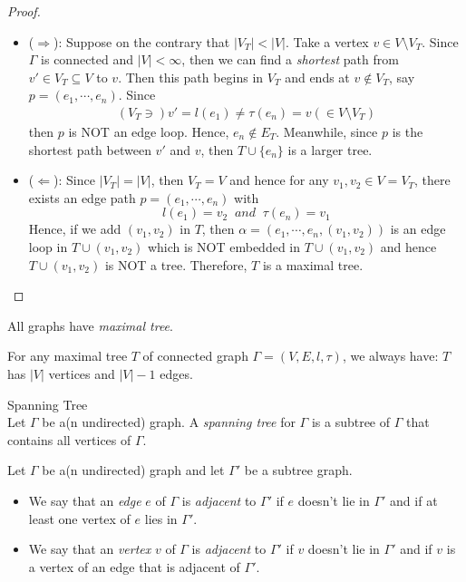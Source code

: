 \begin{proof}
    \begin{itemize}
        \item ($\Rightarrow$): Suppose on the contrary that $|V_T| < |V|$. Take a vertex $v \in V \setminus V_T$. Since $\Gamma$ is connected and $|V| <\infty$, then we can find a \textit{shortest} path from $v' \in V_T \subseteq V$ to $v$. Then this path begins in $V_T$ and ends at $v \notin V_T$, say $p= (e_1 ,\cdots, e_n)$. Since
        \begin{align*}
            (V_T \ni)   v' =l(e_1) \neq  \tau(e_n) = v (\in V \setminus V_T)
        \end{align*}
        then $p$ is NOT an edge loop. Hence, $e_n \notin E_T$. Meanwhile, since $p$ is the shortest path between $v'$ and $v$, then $T \cup \{ e_n \}$ is a larger tree.
        \item ($\Leftarrow$): Since $|V_T| = |V|$, then $V_T = V$ and hence for any $v_1 ,v_2 \in V = V_T$, there exists an edge path $p= (e_1 ,\cdots, e_n)$ with
        $$l(e_1) = v_2\;\;and\;\; \tau(e_n) = v_1$$
        Hence, if we add $(v_1,v_2)$ in $T$, then $\alpha = (e_1 ,\cdots, e_n ,(v_1, v_2))$ is an edge loop in $T \cup (v_1,v_2)$ which is NOT embedded in $T \cup (v_1,v_2)$ and hence $T \cup (v_1,v_2)$ is NOT a tree. Therefore, $T$ is a maximal tree.
    \end{itemize}
\end{proof}

\begin{corollary}
    All graphs have \textit{maximal tree}.
\end{corollary}

\begin{corollary}
    For any maximal tree $T$ of connected graph $\Gamma = (V,E,l,\tau)$, we always have: $T$ has $|V|$ vertices and $|V|-1$ edges.
\end{corollary}

\begin{definition}{Spanning Tree}\\
Let $\Gamma$ be a(n undirected) graph. A \textit{spanning tree} for $\Gamma$ is a subtree of $\Gamma$ that contains all vertices of $\Gamma$.
\end{definition}

\begin{definition}
    Let $\Gamma$ be a(n undirected) graph and let $\Gamma'$ be a subtree graph.
    \begin{itemize}
        \item We say that an \textit{edge} $e$ of $\Gamma$ is \textit{adjacent} to $\Gamma'$ if $e$ doesn't lie in $\Gamma'$ and if at least one vertex of $e$ lies in $\Gamma'$.
        \item We say that an \textit{vertex} $v$ of $\Gamma$ is \textit{adjacent} to $\Gamma'$ if $v$ doesn't lie in $\Gamma'$ and if $v$ is a vertex of an edge that is adjacent of $\Gamma'$.
    \end{itemize}
\end{definition}

